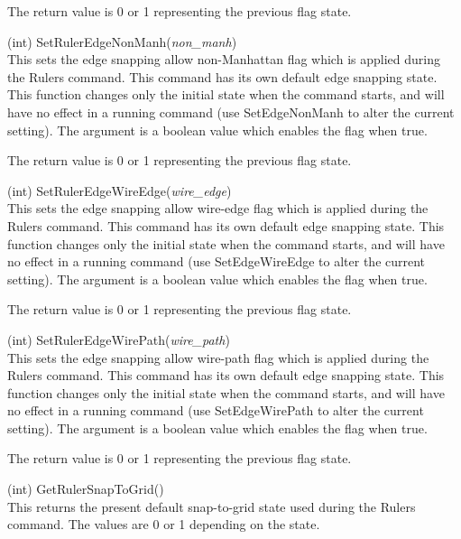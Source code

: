\begin{description}
The return value is 0 or 1 representing the previous flag state.

\item{(int) \vt SetRulerEdgeNonManh({\it non\_manh})}\\
This sets the edge snapping allow non-Manhattan flag which is applied
during the {\cb Rulers} command.  This command has its own default
edge snapping state.  This function changes only the initial state
when the command starts, and will have no effect in a running command
(use {\vt SetEdgeNonManh} to alter the current setting).  The argument
is a boolean value which enables the flag when true.

The return value is 0 or 1 representing the previous flag state.

\item{(int) \vt SetRulerEdgeWireEdge({\it wire\_edge})}\\
This sets the edge snapping allow wire-edge flag which is applied
during the {\cb Rulers} command.  This command has its own default
edge snapping state.  This function changes only the initial state
when the command starts, and will have no effect in a running command
(use {\vt SetEdgeWireEdge} to alter the current setting).  The
argument is a boolean value which enables the flag when true.

The return value is 0 or 1 representing the previous flag state.

\item{(int) \vt SetRulerEdgeWirePath({\it wire\_path})}\\
This sets the edge snapping allow wire-path flag which is applied
during the {\cb Rulers} command.  This command has its own default
edge snapping state.  This function changes only the initial state
when the command starts, and will have no effect in a running command
(use {\vt SetEdgeWirePath} to alter the current setting).  The
argument is a boolean value which enables the flag when true.

The return value is 0 or 1 representing the previous flag state.

\item{(int) \vt GetRulerSnapToGrid()}\\
This returns the present default snap-to-grid state used during the
{\cb Rulers} command.  The values are 0 or 1 depending on the state.


\end{description}
